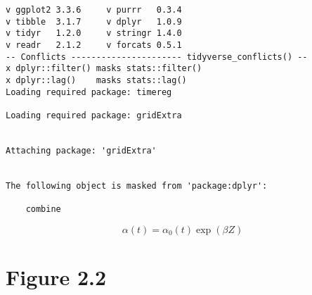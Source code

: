 \documentclass[
  letterpaper,
  DIV=11,
  numbers=noendperiod]{scrreprt}
\begin{document}
\begin{verbatim}
v ggplot2 3.3.6     v purrr   0.3.4
v tibble  3.1.7     v dplyr   1.0.9
v tidyr   1.2.0     v stringr 1.4.0
v readr   2.1.2     v forcats 0.5.1
-- Conflicts ---------------------- tidyverse_conflicts() --
x dplyr::filter() masks stats::filter()
x dplyr::lag()    masks stats::lag()
Loading required package: timereg

Loading required package: gridExtra


Attaching package: 'gridExtra'


The following object is masked from 'package:dplyr':

    combine
\end{verbatim}

\[\alpha(t)=\alpha_0(t)\exp(\beta Z)\]

\hypertarget{fig2-2}{%
\section*{Figure 2.2}\label{fig2-2}}

\end{document}
